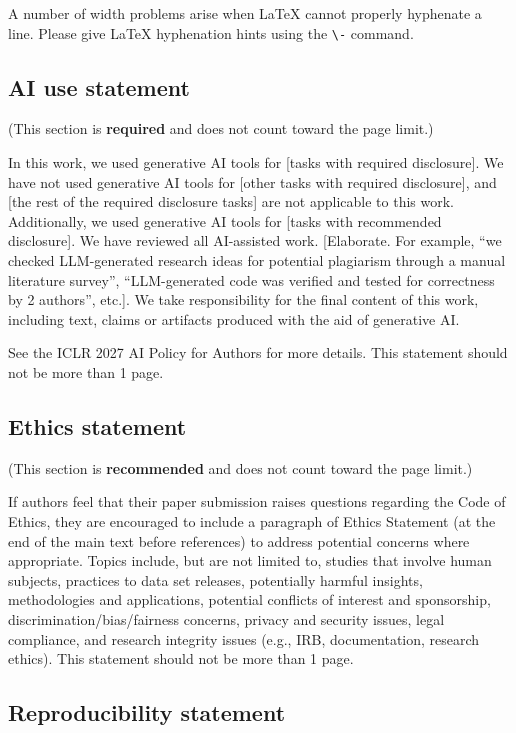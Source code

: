 \documentclass{article} %
\theoremstyle{plain}
\theoremstyle{definition}
\theoremstyle{remark}
\begin{document}
A number of width problems arise when LaTeX cannot properly hyphenate a
line. Please give LaTeX hyphenation hints using the \verb+\-+ command.

\subsection*{AI use statement}

(This section is \textbf{required} and does not count toward the page limit.)

In this work, we used generative AI tools for [tasks with required disclosure].
We have not used generative AI tools for [other tasks with required disclosure],
and [the rest of the required disclosure tasks] are not applicable to this work.
Additionally, we used generative AI tools for [tasks with recommended
disclosure]. We have reviewed all AI-assisted work. [Elaborate. For example, “we
checked LLM-generated research ideas for potential plagiarism through a manual
literature survey”, “LLM-generated code was verified and tested for correctness
by 2 authors”, etc.]. We take responsibility for the final content of this work,
including text, claims or artifacts produced with the aid of generative AI.

See the ICLR 2027 AI Policy for Authors for more details. This statement should
not be more than 1 page.

\subsection*{Ethics statement}

(This section is \textbf{recommended} and does not count toward the page limit.)

If authors feel that their paper submission raises questions regarding the Code
of Ethics, they are encouraged to include a paragraph of Ethics Statement (at
the end of the main text before references) to address potential concerns where
appropriate. Topics include, but are not limited to, studies that involve human
subjects, practices to data set releases, potentially harmful insights,
methodologies and applications, potential conflicts of interest and sponsorship,
discrimination/bias/fairness concerns, privacy and security issues, legal
compliance, and research integrity issues (e.g., IRB, documentation, research
ethics). This statement should not be more than 1 page.

\subsection*{Reproducibility statement}
\end{document}
